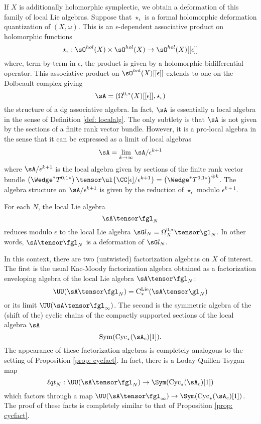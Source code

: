 If $X$ is additionally holomorphic symplectic, we obtain a deformation of this family of local Lie algebras. 
Suppose that $\star_\epsilon$ is a formal holomorphic deformation quantization of $(X,\omega)$. 
This is an $\epsilon$-dependent associative product on holomorphic functions 
\[
\star_\epsilon : \sO^{hol}(X) \times \sO^{hol}(X) \to \sO^{hol}(X)[[\epsilon]]
\]
where, term-by-term in $\epsilon$, the product is given by a holomorphic bidifferential operator. 
This associative product on $\sO^{hol}(X)[[\epsilon]]$ extends to one on the Dolbeault complex giving
\[
\sA = (\Omega^{0,*}(X)[[\epsilon]], \star_{\epsilon})
\]
the structure of a dg associative algebra. 
In fact, $\sA$ is essentially a local algebra in the sense of Definition \ref{def: localalg}. 
The only subtlety is that $\sA$ is not given by the sections of a finite rank vector bundle.
However, it is a pro-local algebra in the sense that it can be expressed as a limit of local algebras
\[
\sA = \lim_{k \to \infty} \sA / \epsilon^{k+1} 
\] 
where $\sA / \epsilon^{k+1}$ is the local algebra given by sections of the finite rank vector bundle $\left(\Wedge^* T^{0,1*}\right) \tensor \ul{\CC[\epsilon]/\epsilon^{k+1}} = \left(\Wedge^* T^{0,1*}\right)^{\oplus k}$.
The algebra structure on $\sA / \epsilon^{k+1}$ is given by the reduction of $\star_{\epsilon}$ modulo $\epsilon^{k+1}$. 

For each $N$, the local Lie algebra 
\[
\sA \tensor \fgl_N
\]
reduces modulo $\epsilon$ to the local Lie algebra $\sG l_N = \Omega^{0,*}_X \tensor \gl_N$.
In other words, $\sA \tensor \fgl_N$ is a deformation of $\sG l_N$. 

In this context, there are two (untwisted) factorization algebras on $X$ of interest. 
The first is the usual Kac-Moody factorization algebra obtained as a factorization enveloping algebra of the local Lie algebra $\sA \tensor \fgl_N$:
\[
\UU(\sA \tensor \fgl_N) = {\rm C}^{\rm Lie}_*(\sA \tensor \gl_N)
\]
or its limit $\UU(\sA \tensor \fgl_\infty)$.
The second is the symmetric algebra of the (shift of the) cyclic chains of the compactly supported sections of the local algebra $\sA$
\[
{\rm Sym}(\cycls(\sA_c)[1]) .
\]
The appearance of these factorization algebras is completely analogous to the setting of Proposition \ref{prop: cycfact}.
In fact, there is a Loday-Quillen-Tsygan map
\[
\lqt_N: \UU (\sA \tensor \fgl_N) \to \Sym(\cycls(\sA_c)[1])
\]
which factors through a map $\UU (\sA \tensor \fgl_\infty) \to \Sym(\cycls(\sA_c)[1])$. 
The proof of these facts is completely similar to that of Proposition \ref{prop: cycfact}. 

